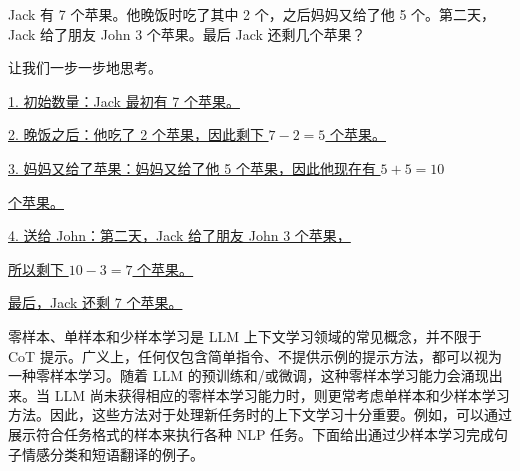 \vspace{0.5em}
\begin{tcolorbox}
\begin{center}
\parbox{0.9\textwidth}
{

{\color{blue} Jack 有 7 个苹果。他晚饭时吃了其中 2 个，之后妈妈又给了他 5 个。第二天，Jack 给了朋友 John 3 个苹果。最后 Jack 还剩几个苹果？}

{\color{blue} 让我们一步一步地思考。}

\vspace{0.3em}

\underline{1. 初始数量：Jack 最初有 7 个苹果。}

\underline{2. 晚饭之后：他吃了 2 个苹果，因此剩下 $7-2=5$ 个苹果。}

\underline{3. 妈妈又给了苹果：妈妈又给了他 5 个苹果，因此他现在有 $5+5=10$ }

\hspace{0.8em} \underline{个苹果。}

\underline{4. 送给 John：第二天，Jack 给了朋友 John 3 个苹果，}

\hspace{0.8em} \underline{所以剩下 $10-3=7$ 个苹果。}

\underline{最后，Jack 还剩 7 个苹果。}

}
\end{center}
\end{tcolorbox}
\vspace{0.5em}

零样本、单样本和少样本学习是 LLM 上下文学习领域的常见概念，并不限于 CoT 提示。广义上，任何仅包含简单指令、不提供示例的提示方法，都可以视为一种零样本学习。随着 LLM 的预训练和/或微调，这种零样本学习能力会涌现出来。当 LLM 尚未获得相应的零样本学习能力时，则更常考虑单样本和少样本学习方法。因此，这些方法对于处理新任务时的上下文学习十分重要。例如，可以通过展示符合任务格式的样本来执行各种 NLP 任务。下面给出通过少样本学习完成句子情感分类和短语翻译的例子。

